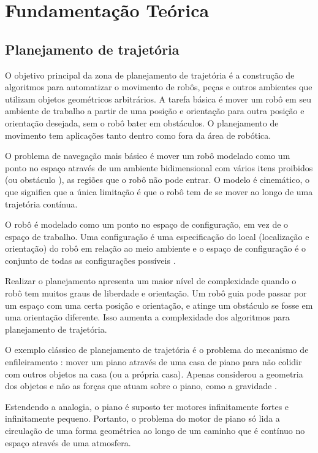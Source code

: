 \documentclass[font=plain]{abnt}
\begin{document}


\chapter{Fundamentação Teórica}

\section{Planejamento de trajet\'oria}
O objetivo principal da zona de planejamento de trajetória é a construção de algoritmos para automatizar o movimento de robôs, 
peças e outros ambientes que utilizam objetos geométricos arbitrários. A tarefa básica é mover um robô em seu ambiente de trabalho 
a partir de uma posição e orientação para outra posição e orientação desejada, sem o robô bater em obstáculos. O planejamento de 
movimento tem aplicações tanto dentro como fora da área de robótica.

O problema de navegação mais básico é mover um robô modelado como um ponto no espaço através de um ambiente bidimensional com vários
itens proibidos (ou obstáculo ), as regiões que o robô não pode entrar. O modelo é cinemático, o que significa que a única limitação
é que o robô tem de se mover ao longo de uma trajetória contínua.

O robô é modelado como um ponto no espaço de configuração, em vez de o espaço de trabalho. Uma configuração é uma especificação
do local (localização e orientação) do robô em relação ao meio ambiente e o espaço de configuração é o conjunto de todas as configurações
possíveis \cite{achoset}.

Realizar o planejamento apresenta um maior nível de complexidade quando o robô tem muitos graus de liberdade e orientação. Um robô 
guia pode passar por um espaço com uma certa posição e orientação, e atinge um obstáculo se fosse em uma orientação diferente. Isso 
aumenta a complexidade dos algoritmos para planejamento de trajetória.

O exemplo clássico de planejamento de trajetória é o problema do mecanismo de enfileiramento \cite{bsharir}: 
mover um piano através de uma casa de piano para não colidir com outros objetos na casa (ou a própria casa). Apenas considerou a 
geometria dos objetos e não as forças que atuam sobre o piano, como a gravidade .

Estendendo a analogia, o piano é suposto ter motores infinitamente fortes e infinitamente pequeno. Portanto, o problema do motor 
de piano só lida a circulação de uma forma geométrica ao longo de um caminho que é contínuo no espaço através de uma atmosfera.
\end{document}
